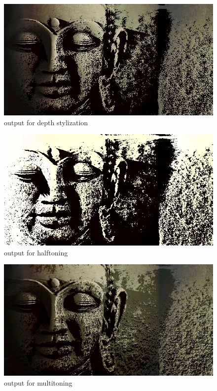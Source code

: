 \documentclass[conference]{IEEEtran}
\begin{document}
 \begin{figure}[h]
 	\includegraphics[width = \linewidth]{buddha_out2.jpg}
 	\caption{output for depth stylization}
 	\label{fig:outputDStylization}
 \end{figure} 
 
  \begin{figure}[h]
 	\includegraphics[width = \linewidth]{buddha_out_bw.jpg}
 	\caption{output for halftoning}
 	\label{fig:outputHalf}
 \end{figure} 
 
   \begin{figure}[h]
 	\includegraphics[width = \linewidth]{buddha_out_2sources.jpg}
 	\caption{output for multitoning}
 	\label{fig:outputMulti}
 \end{figure}
 
\end{document}
